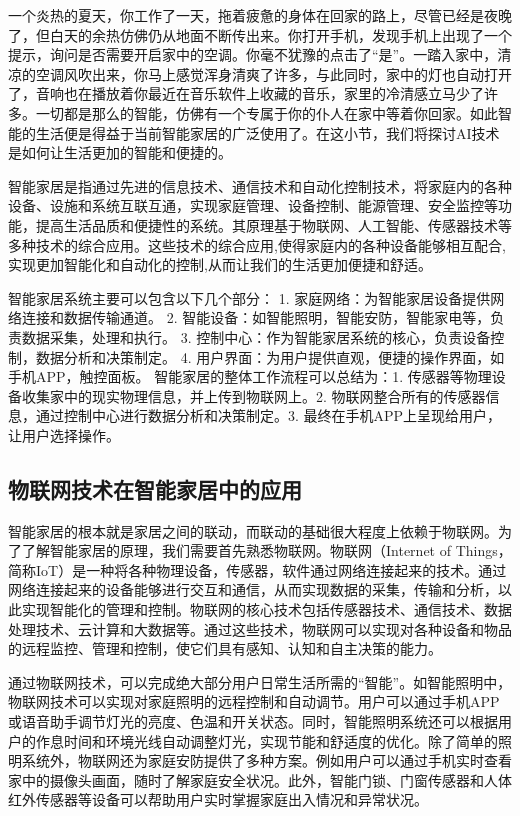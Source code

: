 一个炎热的夏天，你工作了一天，拖着疲惫的身体在回家的路上，尽管已经是夜晚了，但白天的余热仿佛仍从地面不断传出来。你打开手机，发现手机上出现了一个提示，询问是否需要开启家中的空调。你毫不犹豫的点击了“是”。一踏入家中，清凉的空调风吹出来，你马上感觉浑身清爽了许多，与此同时，家中的灯也自动打开了，音响也在播放着你最近在音乐软件上收藏的音乐，家里的冷清感立马少了许多。一切都是那么的智能，仿佛有一个专属于你的仆人在家中等着你回家。如此智能的生活便是得益于当前智能家居的广泛使用了。在这小节，我们将探讨AI技术是如何让生活更加的智能和便捷的。

智能家居是指通过先进的信息技术、通信技术和自动化控制技术，将家庭内的各种设备、设施和系统互联互通，实现家庭管理、设备控制、能源管理、安全监控等功能，提高生活品质和便捷性的系统。其原理基于物联网、人工智能、传感器技术等多种技术的综合应用。这些技术的综合应用,使得家庭内的各种设备能够相互配合,实现更加智能化和自动化的控制,从而让我们的生活更加便捷和舒适。

智能家居系统主要可以包含以下几个部分：
1. 家庭网络：为智能家居设备提供网络连接和数据传输通道。
2. 智能设备：如智能照明，智能安防，智能家电等，负责数据采集，处理和执行。
3. 控制中心：作为智能家居系统的核心，负责设备控制，数据分析和决策制定。
4. 用户界面：为用户提供直观，便捷的操作界面，如手机APP，触控面板。
        智能家居的整体工作流程可以总结为：1. 传感器等物理设备收集家中的现实物理信息，并上传到物联网上。2. 物联网整合所有的传感器信息，通过控制中心进行数据分析和决策制定。3. 最终在手机APP上呈现给用户，让用户选择操作。

\subsection{物联网技术在智能家居中的应用}
智能家居的根本就是家居之间的联动，而联动的基础很大程度上依赖于物联网。为了了解智能家居的原理，我们需要首先熟悉物联网。物联网（Internet of Things，简称IoT）是一种将各种物理设备，传感器，软件通过网络连接起来的技术。通过网络连接起来的设备能够进行交互和通信，从而实现数据的采集，传输和分析，以此实现智能化的管理和控制。物联网的核心技术包括传感器技术、通信技术、数据处理技术、云计算和大数据等。通过这些技术，物联网可以实现对各种设备和物品的远程监控、管理和控制，使它们具有感知、认知和自主决策的能力。

通过物联网技术，可以完成绝大部分用户日常生活所需的“智能”。如智能照明中，物联网技术可以实现对家庭照明的远程控制和自动调节。用户可以通过手机APP或语音助手调节灯光的亮度、色温和开关状态。同时，智能照明系统还可以根据用户的作息时间和环境光线自动调整灯光，实现节能和舒适度的优化。除了简单的照明系统外，物联网还为家庭安防提供了多种方案。例如用户可以通过手机实时查看家中的摄像头画面，随时了解家庭安全状况。此外，智能门锁、门窗传感器和人体红外传感器等设备可以帮助用户实时掌握家庭出入情况和异常状况。


